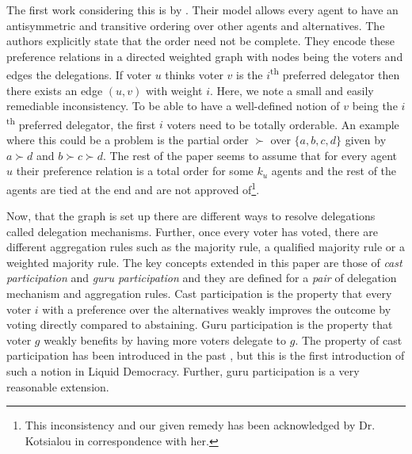 \documentclass[11pt,a4paper, titlepage]{article}
\theoremstyle{definition}
\begin{document}
The first work considering this is by \citet{kotsialou}.
Their model allows every agent to have an antisymmetric and transitive ordering over other agents and alternatives.
The authors explicitly state that the order need not be complete.
They encode these preference relations in a directed weighted graph with nodes being the voters and edges the delegations.
If voter $u$ thinks voter $v$ is the $i$\textsuperscript{th} preferred delegator then there exists an edge $(u, v)$ with weight $i$.
Here, we note a small and easily remediable inconsistency. 
To be able to have a well-defined notion of $v$ being the $i$\textsuperscript{th} preferred delegator, the first $i$ voters need to be totally orderable.
An example where this could be a problem is the partial order $\succ$ over $\{a, b, c, d\}$ given by $a \succ d$ and $b \succ c \succ d$.
The rest of the paper seems to assume that for every agent $u$ their preference relation is a total order for some $k_u$ agents and the rest of the agents are tied at the end and are not approved of\footnote{This inconsistency and our given remedy has been acknowledged by Dr. Kotsialou in correspondence with her.}.

Now, that the graph is set up there are different ways to resolve delegations called delegation mechanisms. Further, once every voter has voted, there are different aggregation rules such as the majority rule, a qualified majority rule or a weighted majority rule.
The key concepts extended in this paper are those of \emph{cast participation} and \emph{guru participation} and they are defined for a \emph{pair} of delegation mechanism and aggregation rules.
Cast participation is the property that every voter $i$ with a preference over the alternatives weakly improves the outcome by voting directly compared to abstaining.
Guru participation is the property that voter $g$ weakly benefits by having more voters delegate to $g$.
The property of cast participation has been introduced in the past \citet{moulin1988condorcet}, but this is the first introduction of such a notion in Liquid Democracy. Further, guru participation is a very reasonable extension.
\end{document}
